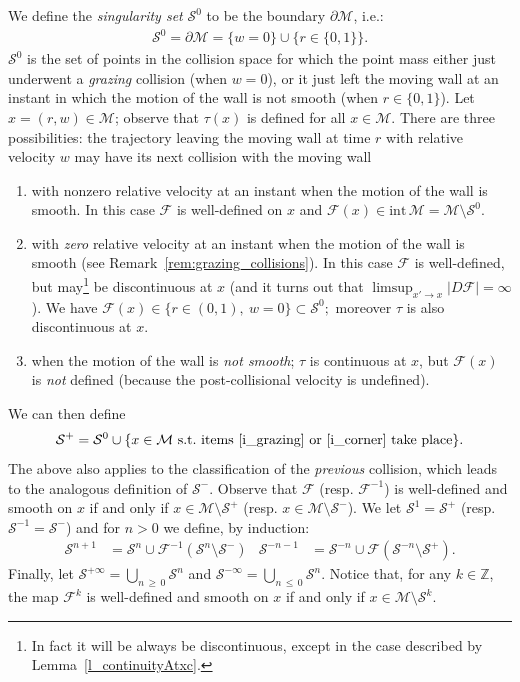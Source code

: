 \documentclass[AHL, Unicode, longabstracts,published]{cedram}
\newcommand{\ct}{r}
\newcommand{\fft}{\tau}
\newcommand{\st}{\ \text{s.t.}\ }
\newcommand{\intr}[1]{\mathrm{int}\,#1}
\newcommand{\inv}{^{-1}}
\newcommand{\bZ}{\mathbb{Z}}
\newcommand{\cm}{\mathcal{F}}
\newcommand{\csp}{\mathcal{M}}
\newcommand{\singPrivate}{\mathcal{S}}
\newcommand{\sing}[1]{\singPrivate^{#1}}
\newcommand{\singForward}[1]{\singPrivate^+_{#1}}
\newcommand{\singBackward}[1]{\singPrivate^-_{#1}}
\newcommand*{\relabel}{\renewcommand{\labelenumi}{(\theenumi)}}
\newcommand*{\alphenumi}{\renewcommand*{\theenumi}{\alph{enumi}}\relabel}
\begin{document}
We define the \emph{singularity set} $\sing0$ to be the boundary $\partial\csp$, i.e.:
\begin{align*}
\sing{0} = \partial\csp =\{w = 0\}\cup \{\ct \in \{0,1\}\}.
\end{align*}
$\sing{0}$ is the set of points in the collision space for which the point mass either just underwent a \emph{grazing} collision (when $w = 0$), or it just left the moving wall at an instant in which the motion of the wall is not smooth (when $r\in\{0,1\}$). Let $x = (\ct,w)\in\csp$; observe that $\fft(x)$ is defined for all $x\in\csp$. There are three possibilities: the trajectory leaving the moving wall at time $\ct$ with relative velocity $w$ may have its next collision with the moving wall
\begin{enumerate}\alphenumi
\item \label{i_regular}
with nonzero relative velocity at an instant when the motion of the wall is smooth. In this case $\cm$ is well-defined on $x$ and $\cm(x)\in\intr\csp = \csp\setminus\sing{0}$.
\item \label{i_grazing}
with \emph{zero} relative velocity at an instant when the motion of the wall is smooth (see Remark~\ref{rem:grazing_collisions}). In this case $\cm$ is well-defined, but may\footnote{In fact it will be always be discontinuous, except in the case described by Lemma~\ref{l_continuityAtxc}.} be discontinuous at $x$ (and it turns out that $ \limsup_{x'\to x}|D \cm|= \infty$). We have $
\cm(x)\in\{r\in(0,1),\ w = 0\}\subset\sing0; $ moreover $\fft$ is also discontinuous at $x$.
\item \label{i_corner}
when the motion of the wall is \emph{not smooth}; $\fft$ is continuous at $x$, but $\cm(x)$ is \emph{not} defined (because the post-collisional velocity is undefined).
\end{enumerate}

We can then define
\begin{align*}
\singForward{} =\sing0 \cup \{x\in\csp\st \text{items~\eqref{i_grazing} {or}~\eqref{i_corner} take place}\}.
\end{align*}
The above also applies to the classification of the \emph{previous} collision, which leads to the analogous definition of $\singBackward{}$. Observe that $\cm$ (resp. $\cm\inv$) is well-defined and smooth on $x$ if and only if $x\in\csp\setminus\singForward{}$ (resp. $x\in\csp\setminus\singBackward{}$). We let $\sing1 = \singForward{}$ (resp. $\sing{-1} = \singBackward{}$) and for $n > 0$ we define, by induction:
\begin{align*}
\sing{n+1} & =\sing{n}\cup\cm\inv(\sing{n}\setminus\singBackward{}) &
\sing{-n-1} & =\sing{-n}\cup\cm\left(\sing{-n}\setminus\singForward{}\right).
\end{align*}
Finally, let $\sing{+\infty} = \bigcup_{n\,\ge\,0}\sing n$ and $\sing{-\infty} = \bigcup_{n\,\le\,0}\sing n$. Notice that, for any $k\in\bZ$, the map $\cm^{k}$ is well-defined and smooth on $x$ if and only if $x\in\csp\setminus\sing{k}$.
\end{document}
